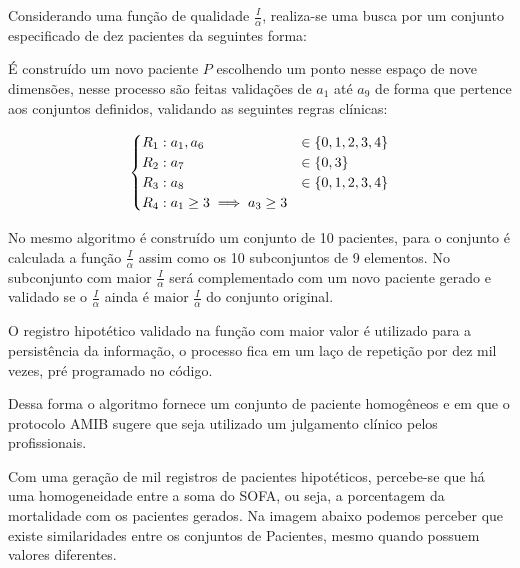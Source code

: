 \documentclass[12pt]{article}
\begin{document}
Considerando uma função de qualidade $\frac{I}{\alpha}$, realiza-se uma busca por um conjunto especificado de dez pacientes da seguintes forma:

É construído um novo paciente $P$ escolhendo um ponto nesse espaço de nove dimensões, nesse processo são feitas validações de $a_1$ até $a_9$ de forma que pertence aos conjuntos definidos, validando as seguintes regras clínicas:

\[
\begin{split}
    \begin{cases}
    R_1: a_1 , a_6 &\in \{0, 1, 2, 3, 4\} \\
    R_2: a_7 &\in \{0, 3\} \\
    R_3: a_8 &\in \{0, 1, 2, 3, 4\} \\
    R_4: a_1 \ge 3 \implies a_3 \ge 3 \\
    \end{cases}
\end{split}
\]

No mesmo algoritmo é construído um conjunto de 10 pacientes, para o conjunto é calculada a função $\frac{I}{\alpha}$ assim como os 10 subconjuntos de 9 elementos.
No subconjunto com maior $\frac{I}{\alpha}$ será complementado com um novo paciente gerado e validado se o $\frac{I}{\alpha}$ ainda é maior $\frac{I}{\alpha}$ do conjunto original.

O registro hipotético validado na função com maior valor é utilizado para a persistência da informação, o processo fica em um laço de repetição por dez mil vezes, pré programado no código.

Dessa forma o algoritmo fornece um conjunto de paciente homogêneos e em que o protocolo AMIB sugere que seja utilizado um julgamento clínico pelos profissionais.


Com uma geração de mil registros de pacientes hipotéticos, percebe-se que há uma homogeneidade entre a soma do SOFA, ou seja, a porcentagem da mortalidade com os pacientes gerados. Na imagem abaixo podemos perceber que existe similaridades entre os conjuntos de Pacientes, mesmo quando possuem valores diferentes.
\end{document}
